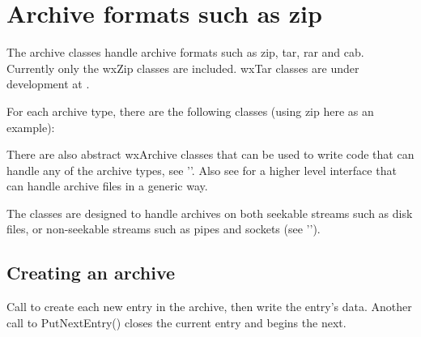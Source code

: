 
\section{Archive formats such as zip}\label{wxarc}

The archive classes handle archive formats such as zip, tar, rar and cab.
Currently only the wxZip classes are included. wxTar classes are under
development at .

For each archive type, there are the following classes (using zip here
as an example):

\begin{twocollist}\twocolwidtha{4cm}
\end{twocollist}

There are also abstract wxArchive classes that can be used to write code
that can handle any of the archive types,
see ''.
Also see  for a higher level interface that
can handle archive files in a generic way.

The classes are designed to handle archives on both seekable streams such
as disk files, or non-seekable streams such as pipes and sockets
(see '').




\subsection{Creating an archive}\label{wxarccreate}


Call  to
create each new entry in the archive, then write the entry's data.
Another call to PutNextEntry() closes the current entry and begins the next.

